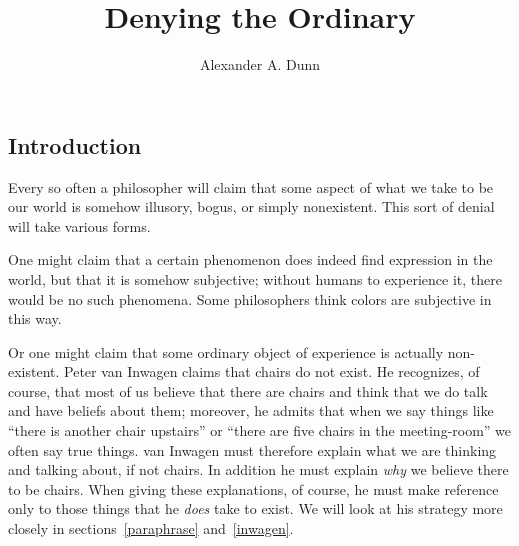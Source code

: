 \documentclass[11pt]{standalone}
\title{Denying the Ordinary}
\author{Alexander A. Dunn}
\newenvironment{inq}{\vspace{0pt}%
	\begin{list}{}%
	{\setlength\labelwidth{0pt}%
	\setlength\leftmargin{2.5\oddsidemargin}%
	\setlength\rightmargin{\leftmargin}}
	\begin{spacing}{1}
	\item[]%
	}{
	\end{spacing}
	\end{list}
	\vspace{10pt}
	}
\begin{document}
\ifstandalone
\maketitle
\tableofcontents
\begin{spacing}{1.5}
\fi





\section{Introduction}
\label{intro-deny}
\noindent Every so often a philosopher will claim that some aspect of
what we take to be our world is somehow illusory, bogus, or simply
nonexistent.  This sort of denial will take various forms.  

One might claim that a certain phenomenon does indeed find expression
in the world, but that it is somehow subjective; without humans to
experience it, there would be no such phenomena.  Some philosophers
think colors are subjective in this way.

Or one might claim that some ordinary object of experience is actually
non-existent.  Peter van Inwagen claims that chairs do not exist.  He
recognizes, of course, that most of us believe that there are chairs
and think that we do talk and have beliefs about them; moreover, he
admits that when we say things like ``there is another chair
upstairs'' or ``there are five chairs in the meeting-room'' we often
say true things.  van Inwagen must therefore explain what we are
thinking and talking about, if not chairs.  In addition he must
explain {\em why} we believe there to be chairs.  When giving these
explanations, of course, he must make reference only to those things
that he \emph{does} take to exist.  We will look at his strategy more
closely in sections~\ref{paraphrase} and~\ref{inwagen}.


\end{spacing}
\end{document}
